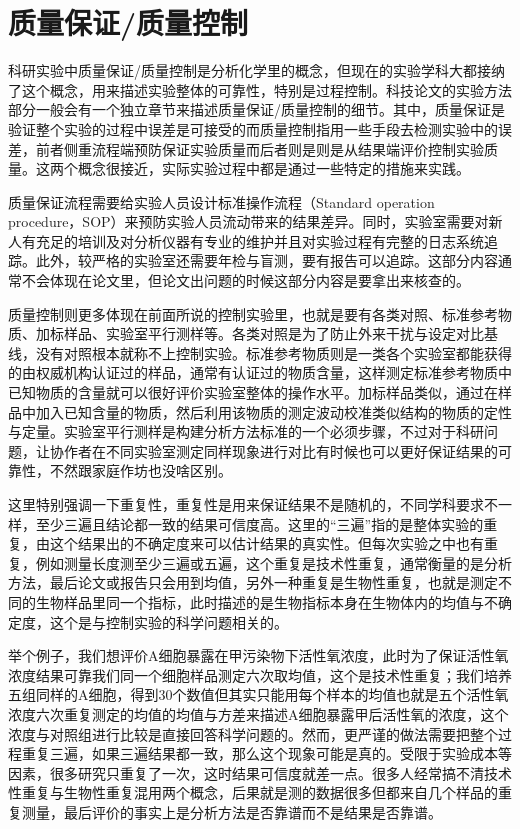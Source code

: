 \documentclass[]{tufte-book}
\begin{document}
\hypertarget{ux8d28ux91cfux4fddux8bc1ux8d28ux91cfux63a7ux5236}{%
\section{质量保证/质量控制}\label{ux8d28ux91cfux4fddux8bc1ux8d28ux91cfux63a7ux5236}}

科研实验中质量保证/质量控制是分析化学里的概念，但现在的实验学科大都接纳了这个概念，用来描述实验整体的可靠性，特别是过程控制。科技论文的实验方法部分一般会有一个独立章节来描述质量保证/质量控制的细节。其中，质量保证是验证整个实验的过程中误差是可接受的而质量控制指用一些手段去检测实验中的误差，前者侧重流程端预防保证实验质量而后者则是则是从结果端评价控制实验质量。这两个概念很接近，实际实验过程中都是通过一些特定的措施来实践。

质量保证流程需要给实验人员设计标准操作流程（Standard operation procedure，SOP）来预防实验人员流动带来的结果差异。同时，实验室需要对新人有充足的培训及对分析仪器有专业的维护并且对实验过程有完整的日志系统追踪。此外，较严格的实验室还需要年检与盲测，要有报告可以追踪。这部分内容通常不会体现在论文里，但论文出问题的时候这部分内容是要拿出来核查的。

质量控制则更多体现在前面所说的控制实验里，也就是要有各类对照、标准参考物质、加标样品、实验室平行测样等。各类对照是为了防止外来干扰与设定对比基线，没有对照根本就称不上控制实验。标准参考物质则是一类各个实验室都能获得的由权威机构认证过的样品，通常有认证过的物质含量，这样测定标准参考物质中已知物质的含量就可以很好评价实验室整体的操作水平。加标样品类似，通过在样品中加入已知含量的物质，然后利用该物质的测定波动校准类似结构的物质的定性与定量。实验室平行测样是构建分析方法标准的一个必须步骤，不过对于科研问题，让协作者在不同实验室测定同样现象进行对比有时候也可以更好保证结果的可靠性，不然跟家庭作坊也没啥区别。

这里特别强调一下重复性，重复性是用来保证结果不是随机的，不同学科要求不一样，至少三遍且结论都一致的结果可信度高。这里的``三遍''指的是整体实验的重复，由这个结果出的不确定度来可以估计结果的真实性。但每次实验之中也有重复，例如测量长度测至少三遍或五遍，这个重复是技术性重复，通常衡量的是分析方法，最后论文或报告只会用到均值，另外一种重复是生物性重复，也就是测定不同的生物样品里同一个指标，此时描述的是生物指标本身在生物体内的均值与不确定度，这个是与控制实验的科学问题相关的。

举个例子，我们想评价A细胞暴露在甲污染物下活性氧浓度，此时为了保证活性氧浓度结果可靠我们同一个细胞样品测定六次取均值，这个是技术性重复；我们培养五组同样的A细胞，得到30个数值但其实只能用每个样本的均值也就是五个活性氧浓度六次重复测定的均值的均值与方差来描述A细胞暴露甲后活性氧的浓度，这个浓度与对照组进行比较是直接回答科学问题的。然而，更严谨的做法需要把整个过程重复三遍，如果三遍结果都一致，那么这个现象可能是真的。受限于实验成本等因素，很多研究只重复了一次，这时结果可信度就差一点。很多人经常搞不清技术性重复与生物性重复混用两个概念，后果就是测的数据很多但都来自几个样品的重复测量，最后评价的事实上是分析方法是否靠谱而不是结果是否靠谱。
\end{document}
